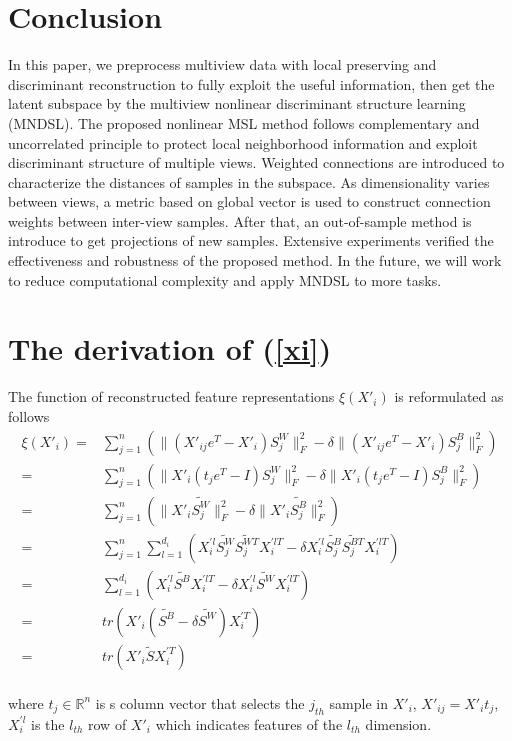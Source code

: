 \documentclass[journal]{IEEEtran}
\begin{document}
\section{Conclusion} \label{conclusion}
In this paper, we preprocess multiview data with local preserving and discriminant reconstruction to fully exploit the useful information, then get the latent subspace by the multiview nonlinear discriminant structure learning (MNDSL). 
The proposed nonlinear MSL method follows complementary and uncorrelated principle to protect local neighborhood information and exploit discriminant structure of multiple views. 
Weighted connections are introduced to characterize the distances of samples in the subspace. 
As dimensionality varies between views, a metric based on global vector is used to construct connection weights between inter-view samples. 
After that, an out-of-sample method is introduce to get projections of new samples. 
Extensive experiments verified the effectiveness and robustness of the proposed method. 
In the future, we will work to reduce computational complexity and apply MNDSL to more tasks. 

\appendices
\section{The derivation of (\ref{xi})} \label{appendix1}
The function of reconstructed feature representations $\xi(X'_i)$ is reformulated as follows
\begin{align*} %
\xi(X'_i) =& \sum_{j=1}^n (\| (X'_{ij}e^T-X'_i)S_j^W \|_F^2 -\delta \|(X'_{ij}e^T-X'_i)S_j^B\|_F^2 ) \\
=& \sum_{j=1}^n ( \| X'_i(t_je^T-I)S_j^W \|_F^2  -\delta \|X'_i(t_je^T-I)S_j^B \|_F^2 ) \\
=& \sum_{j=1}^n ( \| X'_i\tilde{S_j^W} \|_F^2  -\delta \| X'_i\tilde{S_j^B} \|_F^2 ) \\
=& \sum_{j=1}^n \sum_{l=1}^{d_i} ( X_i^{'l}\tilde{S_j^{W}} \tilde{S_j^{WT}} X_i^{'lT} -\delta X_i^{'l}\tilde{S_j^{B}} \tilde{S_j^{BT}} X_i^{'lT} ) \\
=& \sum_{l=1}^{d_i} ( X_i^{'l} \tilde{S^B}X_i^{'lT} -\delta X_i^{'l} \tilde{S^W}X_i^{'lT} ) \\
=& tr( X'_i (\tilde{S^B}-\delta \tilde{S^W}) X_i^{'T} ) \\
=& tr( X'_i \tilde{S} X_i^{'T} ) \\
\end{align*}

where $t_j\in \mathbb{R}^{n} $ is s column vector that selects the $j_{th}$ sample in $X'_i$, $X'_{ij}=X'_i t_j$, $X_i^{'l}$ is the $l_{th}$ row of $X'_i$ which indicates features of the $l_{th}$ dimension. 
\end{document}
